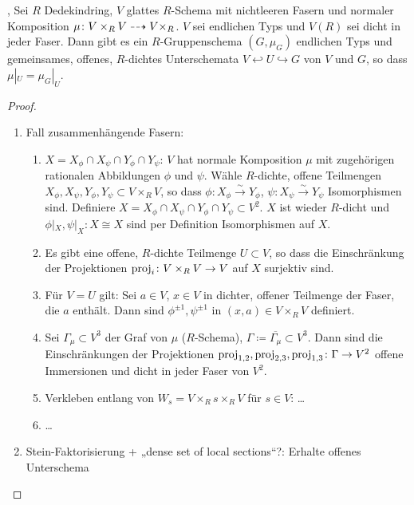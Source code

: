 \documentclass[german]{scrreprt}
\begin{document}
\begin{Satz}\label{thm:weil}
  \cite[Theorem VIII.1.12]{artin},
  \cite[Theorem IV.6.9]{silverman2}
  Sei $R$ Dedekindring, $V$ glattes $R$-Schema mit nichtleeren Fasern
  und normaler Komposition $\mu\colon V\times_R V\dashrightarrow V\times_R$.
  $V$ sei endlichen Typs und $V(R)$ sei dicht in jeder Faser.
  Dann gibt es ein $R$-Gruppenschema $(G,\mu_G)$ endlichen Typs und
  gemeinsames, offenes, $R$-dichtes Unterschemata $V\hookleftarrow
  U\hookrightarrow G$ von $V$ und $G$, so dass $\mu|_U=\mu_G|_U$.
  \begin{proof}
    \begin{enumerate}
    \item Fall zusammenhängende Fasern:
      \begin{enumerate}
      \item $X=X_\phi\cap X_\psi\cap Y_\phi\cap Y_\psi$:
        $V$ hat normale Komposition $\mu$ mit zugehörigen rationalen
        Abbildungen $\phi$ und $\psi$.
        Wähle $R$-dichte, offene Teilmengen
        $X_\phi,X_\psi,Y_\phi,Y_\psi\subset V\times_R V$,
        so dass $\phi\colon X_\phi\overset\sim\to Y_\phi$,
        $\psi\colon X_\psi\overset\sim\to Y_\psi$ Isomorphismen sind.
        Definiere $X=X_\phi\cap X_\psi\cap Y_\phi\cap Y_\psi\subset
        V^2$.
        $X$ ist wieder $R$-dicht und $\phi|_X,\psi|_X\colon X\cong X$
        sind per Definition Isomorphismen auf $X$.
      \item Es gibt eine offene, $R$-dichte Teilmenge $U\subset V$, so
        dass die Einschränkung der Projektionen
        $\text{proj}_i\colon V\times_R V\to V$ auf $X$ surjektiv sind.
      \item Für $V=U$ gilt:
        Sei $a\in V$, $x\in V$ in dichter, offener Teilmenge der
        Faser, die $a$ enthält.
        Dann sind $\phi^{\pm1}, \psi^{\pm1}$ in $(x,a)\in V\times_R V$
        definiert.
      \item Sei $\Gamma_\mu\subset V^3$ der Graf von $\mu$
        ($R$-Schema), $\Gamma\coloneqq \overline{\Gamma_\mu}\subset
        V^3$.
        Dann sind die Einschränkungen der Projektionen
        $\text{proj}_{1,2},\text{proj}_{2,3},\text{proj}_{1,3}\colon \Gamma\to V^2$
        offene Immersionen und dicht in jeder Faser von $V^2$.
      \item Verkleben entlang von $W_s=V\times_R s\times_R V$ für
        $s\in V$:
        …
      \item …
      \end{enumerate}
    \item Stein-Faktorisierung + „dense set of local sections“?:
      Erhalte offenes Unterschema 
    \end{enumerate}
  \end{proof}
\end{Satz}
\end{document}
